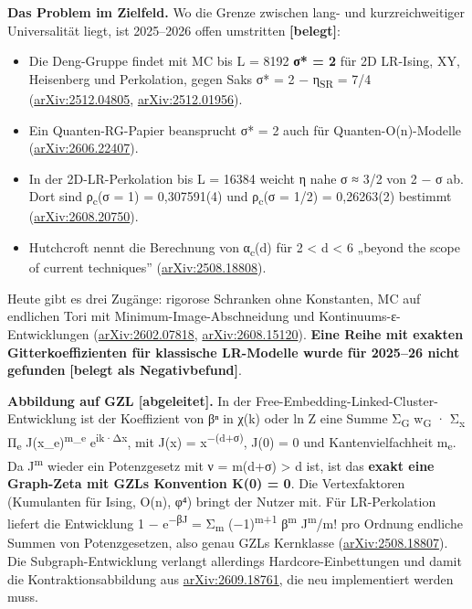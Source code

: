 \textbf{Das Problem im Zielfeld.} Wo die Grenze zwischen lang- und kurzreichweitiger Universalität liegt, ist 2025--2026 offen umstritten \textbf{{[}belegt{]}}:

\begin{itemize}
\tightlist
\item
  Die Deng-Gruppe findet mit MC bis L = 8192 \textbf{σ* = 2} für 2D LR-Ising, XY, Heisenberg und Perkolation, gegen Saks σ* = 2 − η\textsubscript{SR} = 7/4 (\href{https://arxiv.org/abs/2512.04805}{arXiv:2512.04805}, \href{https://arxiv.org/abs/2512.01956}{arXiv:2512.01956}).
\item
  Ein Quanten-RG-Papier beansprucht σ* = 2 auch für Quanten-O(n)-Modelle (\href{https://arxiv.org/abs/2606.22407}{arXiv:2606.22407}).
\item
  In der 2D-LR-Perkolation bis L = 16384 weicht η nahe σ ≈ 3/2 von 2 − σ ab. Dort sind ρ\textsubscript{c}(σ = 1) = 0,307591(4) und ρ\textsubscript{c}(σ = 1/2) = 0,26263(2) bestimmt (\href{https://arxiv.org/abs/2608.20750}{arXiv:2608.20750}).
\item
  Hutchcroft nennt die Berechnung von α\textsubscript{c}(d) für 2 \textless{} d \textless{} 6 „beyond the scope of current techniques'' (\href{https://arxiv.org/abs/2508.18808}{arXiv:2508.18808}).
\end{itemize}

Heute gibt es drei Zugänge: rigorose Schranken ohne Konstanten, MC auf endlichen Tori mit Minimum-Image-Abschneidung und Kontinuums-ε-Entwicklungen (\href{https://arxiv.org/abs/2602.07818}{arXiv:2602.07818}, \href{https://arxiv.org/abs/2608.15120}{arXiv:2608.15120}). \textbf{Eine Reihe mit exakten Gitterkoeffizienten für klassische LR-Modelle wurde für 2025--26 nicht gefunden} \textbf{{[}belegt als Negativbefund{]}}.

\textbf{Abbildung auf GZL {[}abgeleitet{]}.} In der Free-Embedding-Linked-Cluster-Entwicklung ist der Koeffizient von βⁿ in χ(k) oder ln Z eine Summe Σ\textsubscript{G} w\textsubscript{G} · Σ\textsubscript{x} Π\textsubscript{e} J(x\_e)\textsuperscript{m\_e} e\textsuperscript{ik·Δx}, mit J(x) = \textbar x\textbar{}\textsuperscript{−(d+σ)}, J(0) = 0 und Kantenvielfachheit m\textsubscript{e}. Da J\textsuperscript{m} wieder ein Potenzgesetz mit ν = m(d+σ) \textgreater{} d ist, ist das \textbf{exakt eine Graph-Zeta mit GZLs Konvention K(0) = 0}. Die Vertexfaktoren (Kumulanten für Ising, O(n), φ⁴) bringt der Nutzer mit. Für LR-Perkolation liefert die Entwicklung 1 − e\textsuperscript{−βJ} = Σ\textsubscript{m} (−1)\textsuperscript{m+1} β\textsuperscript{m} J\textsuperscript{m}/m! pro Ordnung endliche Summen von Potenzgesetzen, also genau GZLs Kernklasse (\href{https://arxiv.org/abs/2508.18807}{arXiv:2508.18807}). Die Subgraph-Entwicklung verlangt allerdings Hardcore-Einbettungen und damit die Kontraktionsabbildung aus \href{https://arxiv.org/html/2609.18761}{arXiv:2609.18761}, die neu implementiert werden muss.

